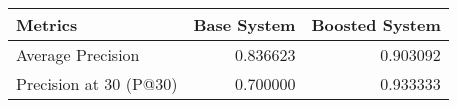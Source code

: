 \begin{tabular}{lrr}
\toprule
               Metrics &  Base System &  Boosted System \\
\midrule
     Average Precision &     0.836623 &        0.903092 \\
Precision at 30 (P@30) &     0.700000 &        0.933333 \\
\bottomrule
\end{tabular}
